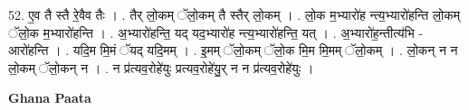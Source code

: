 \documentclass[17pt]{extarticle}
\begin{document}
52. ए॒व तै स्तै रे॒वैव तैः । . तैर् लो॒कम् ॅलो॒कम् तै स्तैर् लो॒कम् । . लो॒क म॒भ्यारो॑ह न्त्य॒भ्यारो॑हन्ति लो॒कम् ॅलो॒क म॒भ्यारो॑हन्ति । . अ॒भ्यारो॑हन्ति॒ यद् यद॒भ्यारो॑ह न्त्य॒भ्यारो॑हन्ति॒ यत् । . अ॒भ्यारो॑ह॒न्तीत्य॑भि - आरो॑हन्ति । . यदि॒म मि॒मं ॅयद् यदि॒मम् । . इ॒मम् ॅलो॒कम् ॅलो॒क मि॒म मि॒मम् ॅलो॒कम् । . लो॒कन् न न लो॒कम् ॅलो॒कन् न । . न प्र॑त्यव॒रोहे॑युः प्रत्यव॒रोहे॑यु॒र् न न प्र॑त्यव॒रोहे॑युः । \newline

\textbf{Ghana Paata } \newline
\end{document}
